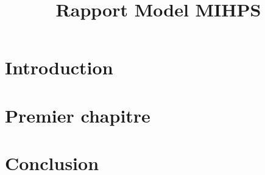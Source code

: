 \documentclass[twoside]{EPURapport}
\title{Rapport Model MIHPS}
\begin{document}
\chapter{Introduction}

\chapter{Premier chapitre}

\chapter{Conclusion}

\annexes
\end{document}
